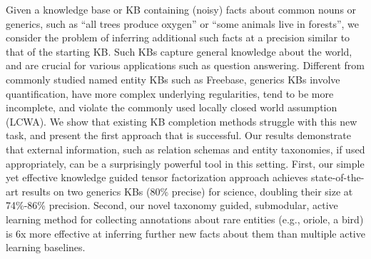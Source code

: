 Given a knowledge base or KB containing (noisy) facts about common nouns or generics, such as ``all trees produce oxygen'' or ``some animals live in forests'', we consider the problem of inferring additional such facts at a precision similar to that of the starting KB. Such KBs capture general knowledge about the world, and are crucial for various applications such as question answering. Different from commonly studied named entity KBs such as Freebase, generics KBs involve quantification, have more complex underlying regularities, tend to be more incomplete, and violate the commonly used locally closed world assumption (LCWA). We show that existing KB completion methods struggle with this new task, and present the first approach that is successful. Our results demonstrate that external information, such as relation schemas and entity taxonomies, if used appropriately, can be a surprisingly powerful tool in this setting. First, our simple yet effective knowledge guided tensor factorization approach achieves state-of-the-art results on two generics KBs (80\% precise) for science, doubling their size at 74\%-86\% precision. Second, our novel taxonomy guided, submodular, active learning method for collecting annotations about rare entities (e.g., oriole, a bird) is 6x more effective at inferring further new facts about them than multiple active learning baselines.
